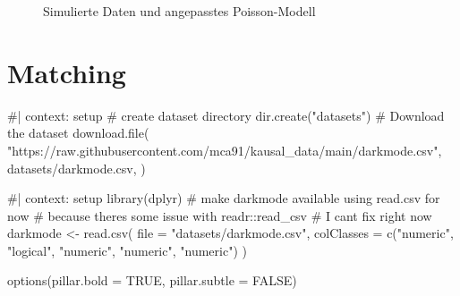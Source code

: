\documentclass[
  a4paper,
  DIV=11,
  oneside]{scrreprt}
\newenvironment{Shaded}{\begin{snugshade}}{\end{snugshade}}
\newcommand{\NormalTok}[1]{\textcolor[rgb]{0.00,0.23,0.31}{#1}}
\begin{document}
\begin{figure}[t]


\caption{\label{fig-poissonregexample}Simulierte Daten und angepasstes
Poisson-Modell}

\end{figure}%


\chapter{Matching}\label{matching}

\begin{Shaded}
\begin{Highlighting}[]
\NormalTok{\#| context: setup}
\NormalTok{\# create dataset directory}
\NormalTok{dir.create("datasets")}
\NormalTok{\# Download the dataset}
\NormalTok{download.file(}
\NormalTok{    "https://raw.githubusercontent.com/mca91/kausal\_data/main/darkmode.csv",}
\NormalTok{    \textquotesingle{}datasets/darkmode.csv\textquotesingle{},}
\NormalTok{)}
\end{Highlighting}
\end{Shaded}

\begin{Shaded}
\begin{Highlighting}[]
\NormalTok{\#| context: setup}
\NormalTok{library(dplyr)}
\NormalTok{\# make darkmode available using read.csv for now}
\NormalTok{\# because there\textquotesingle{}s some issue with readr::read\_csv}
\NormalTok{\# I can\textquotesingle{}t fix right now}
\NormalTok{darkmode \textless{}{-} read.csv(}
\NormalTok{    file = "datasets/darkmode.csv", }
\NormalTok{    colClasses = c("numeric", "logical", "numeric", "numeric", "numeric") }
\NormalTok{)}

\NormalTok{options(pillar.bold = TRUE, pillar.subtle = FALSE)}
\end{Highlighting}
\end{Shaded}
\end{document}
